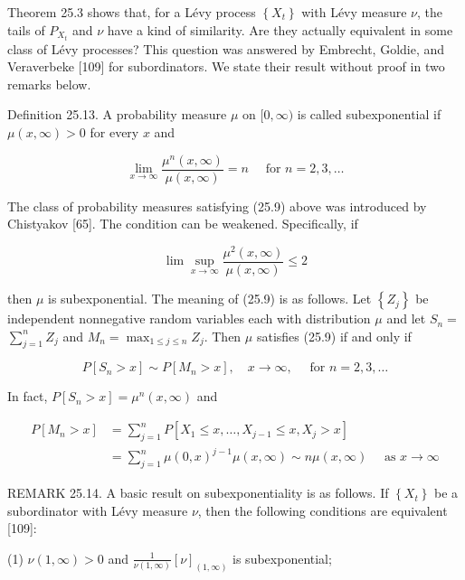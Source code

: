 \documentclass[a4paper,11pt]{article}
\begin{document}
Theorem 25.3 shows that, for a Lévy process $\left\{X_{t}\right\}$ with Lévy measure $\nu$,
the tails of $P_{X_{t}}$ and $\nu$ have a kind of similarity. Are they actually equivalent
in some class of Lévy processes? This question was answered by Embrecht, Goldie, and Veraverbeke [109]
for subordinators. We state their result without proof in two remarks below. \\


Definition 25.13. A probability measure $\mu$ on $[0, \infty)$ is called
subexponential if $\mu(x, \infty)>0$ for every $x$ and

\begin{equation*}
    \lim _{x \rightarrow \infty} \frac{\mu^{n}(x, \infty)}{\mu(x, \infty)}=n \quad \text { for } n=2,3, \ldots \tag{25.9}
\end{equation*}

The class of probability measures satisfying (25.9) above was introduced by Chistyakov [65].
The condition can be weakened. Specifically, if

$$
    \lim \sup _{x \rightarrow \infty} \frac{\mu^{2}(x, \infty)}{\mu(x, \infty)} \leq 2
$$

then $\mu$ is subexponential. The meaning of (25.9) is as follows. Let $\left\{Z_{j}\right\}$
be independent nonnegative random variables each with distribution $\mu$
and let $S_{n}=$ $\sum_{j=1}^{n} Z_{j}$ and $M_{n}=\max _{1 \leq j \leq n} Z_{j}$.
Then $\mu$ satisfies (25.9) if and only if

$$
    P\left[S_{n}>x\right] \sim P\left[M_{n}>x\right], \quad x \rightarrow \infty, \quad \text { for } n=2,3, \ldots
$$

In fact, $P\left[S_{n}>x\right]=\mu^{n}(x, \infty)$ and

$$
    \begin{aligned}
        P\left[M_{n}>x\right] & =\sum_{j=1}^{n} P\left[X_{1} \leq x, \ldots, X_{j-1} \leq x, X_{j}>x\right]                                  \\
                              & =\sum_{j=1}^{n} \mu(0, x)^{j-1} \mu(x, \infty) \sim n \mu(x, \infty) \quad \text { as } x \rightarrow \infty
    \end{aligned}
$$

REMARK 25.14. A basic result on subexponentiality is as follows. If $\left\{X_{t}\right\}$
be a subordinator with Lévy measure $\nu$, then the following conditions are equivalent [109]:

(1) $\nu(1, \infty)>0$ and $\frac{1}{\nu(1, \infty)}[\nu]_{(1, \infty)}$ is subexponential; \\
\end{document}
